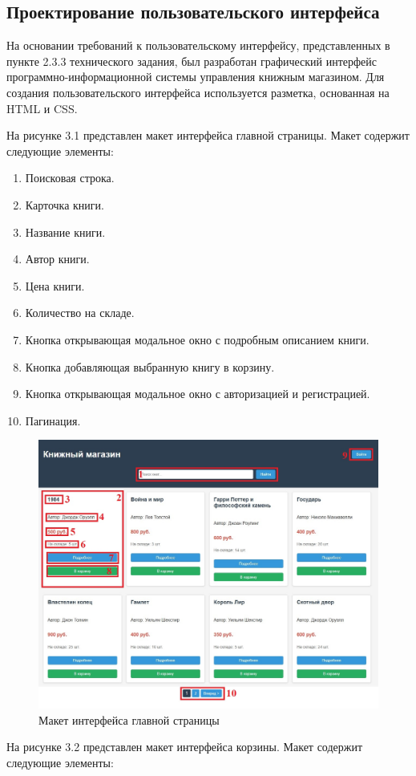 \subsection{Проектирование пользовательского интерфейса}

На основании требований к пользовательскому интерфейсу, представленных в пункте 2.3.3 технического задания, был разработан графический интерфейс программно-информационной системы управления книжным магазином. Для создания пользовательского интерфейса используется разметка, основанная на HTML и CSS.

На рисунке 3.1 представлен макет интерфейса главной страницы. Макет содержит следующие элементы:
\begin{enumerate}
	\item Поисковая строка.
	\item Карточка книги.
	\item Название книги.
	\item Автор книги.
	\item Цена книги.
	\item Количество на складе.
	\item Кнопка открывающая модальное окно с  подробным описанием книги.
	\item Кнопка добавляющая выбранную книгу в корзину.
	\item Кнопка открывающая модальное окно с авторизацией и регистрацией.
	\item Пагинация.
\end{enumerate}

\begin{figure}[H]
	\centering
	\includegraphics[width=0.7\linewidth]{images/Главная_страница}
	\caption{Макет интерфейса главной страницы}
	\label{fig:}
\end{figure}

На рисунке 3.2 представлен макет интерфейса корзины. Макет содержит следующие элементы:

